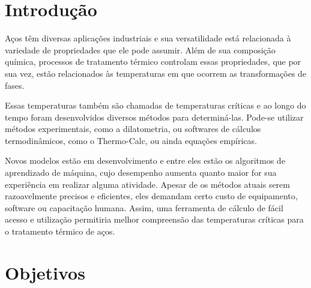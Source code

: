 \documentclass[brazil,tese,epusp]{usp}
\begin{document}




\resumo{

}

\resumole{}


\elementospretextuais  %

\setlength\parindent{.85cm}  %

\chapter{Introdução}

Aços têm diversas aplicações industriais e sua versatilidade está relacionada à variedade de propriedades que ele pode assumir. Além de sua composição química, processos de tratamento térmico controlam essas propriedades, que por sua vez, estão relacionados às temperaturas em que ocorrem as transformações de fases.

Essas temperaturas também são chamadas de temperaturas críticas e ao longo do tempo foram desenvolvidos diversos métodos para determiná-las. Pode-se utilizar métodos experimentais, como a dilatometria, ou softwares de cálculos termodinâmicos, como o Thermo-Calc\textregistered{}, ou ainda equações empíricas.

Novos modelos estão em desenvolvimento e entre eles estão os algoritmos de aprendizado de máquina, cujo desempenho aumenta quanto maior for sua experiência em realizar alguma atividade. Apesar de os métodos atuais serem razoavelmente precisos e eficientes, eles demandam certo custo de equipamento, software ou capacitação humana. Assim, uma ferramenta de cálculo de fácil acesso e utilização permitiria melhor compreensão das temperaturas críticas para o tratamento térmico de aços.

\chapter{Objetivos}
\end{document}
